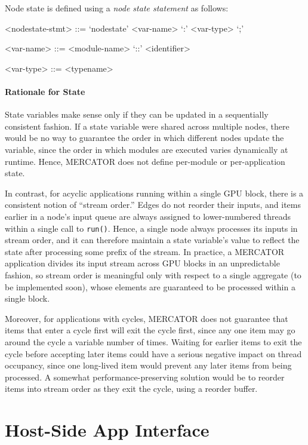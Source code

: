 \documentclass[11pt]{article}
\begin{document}
Node state is defined using a \textit{node state statement} as follows:
\begin{grammar}

<nodestate-stmt> ::= `nodestate' <var-name> `:' <var-type> `;'

<var-name> ::= <module-name> `::' <identifier>

<var-type> ::= <typename>

\end{grammar}

\paragraph*{Rationale for State}
State variables make sense only if they can be updated in a
sequentially consistent fashion. If a state variable were shared
across multiple nodes, there would be no way to guarantee the order
in which different nodes update the variable, since the order in
which modules are executed varies dynamically at runtime.  Hence,
MERCATOR does not define per-module or per-application state.

In contrast, for acyclic applications running within a single GPU
block, there is a consistent notion of ``stream order.''  Edges do not
reorder their inputs, and items earlier in a node's input queue are
always assigned to lower-numbered threads within a single call to
\texttt{run()}.  Hence, a single node always processes its inputs in
stream order, and it can therefore maintain a state variable's value
to reflect the state after processing some prefix of the stream.
In practice, a MERCATOR application divides its input stream across
GPU blocks in an unpredictable fashion, so stream order is meaningful
only with respect to a single aggregate (to be implemented soon),
whose elements are guaranteed to be processed within a single block.

Moreover, for applications with cycles, MERCATOR does not guarantee
that items that enter a cycle first will exit the cycle first, since
any one item may go around the cycle a variable number of times.
Waiting for earlier items to exit the cycle before accepting later
items could have a serious negative impact on thread occupancy, since
one long-lived item would prevent any later items from being
processed.  A somewhat performance-preserving solution would be to
reorder items into stream order as they exit the cycle, using a
reorder buffer.

\section{Host-Side App Interface}
\end{document}
